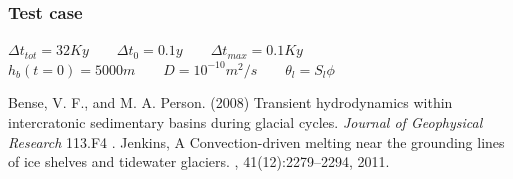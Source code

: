 \documentclass{beamer}
\begin{document}
\begin{frame}
\frametitle{Test case}
{\centering
$\Delta t_{tot} = 32 Ky \qquad \Delta t _0 =0.1y \qquad \Delta t_{max}= 0.1Ky$\\
$ h_b(t=0)=5000m \qquad D  =10^{-10} m^2/s  \qquad \theta_{l}=S_l\phi$
}
\begin{thebibliography}{99} 
 Bense, V. F., and M. A. Person. (2008)
\newblock Transient hydrodynamics within intercratonic sedimentary basins during glacial cycles.
\newblock \emph{Journal of Geophysical Research} 113.F4 .
Jenkins, A
\newblock Convection-driven melting near the grounding lines of ice shelves and
  tidewater glaciers.
, 41(12):2279--2294, 2011.
\end{thebibliography}
\end{frame}
\end{document}
